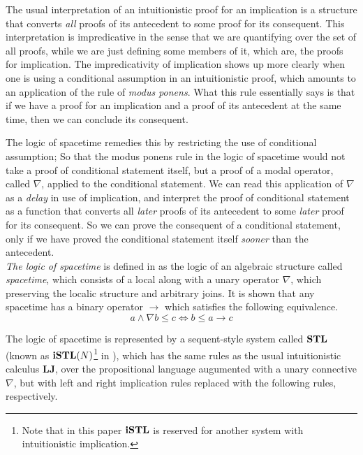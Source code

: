 The usual interpretation of an intuitionistic proof for an implication is a structure that converts \emph{all} proofs of its antecedent to some proof for its consequent. This interpretation is impredicative in the sense that we are quantifying over the set of all proofs, while we are just defining some members of it, which are, the proofs for implication. The impredicativity of implication shows up more clearly when one is using a conditional assumption in an intuitionistic proof, which amounts to an application of the rule of \emph{modus ponens}. What this rule essentially says is that if we have a proof for an implication and a proof of its antecedent at the same time, then we can conclude its consequent.

The logic of spacetime remedies this by restricting the use of conditional assumption; So that the modus ponens rule in the logic of spacetime would not take a proof of conditional statement itself, but a proof of a modal operator, called $\nabla$, applied to the conditional statement. We can read this application of $\nabla$ as a \emph{delay} in use of implication, and interpret the proof of conditional statement as a function that converts all \emph{later} proofs of its antecedent to some \emph{later} proof for its consequent. So we can prove the consequent of a conditional statement, only if we have proved the conditional statement itself \emph{sooner} than the antecedent.\\


\emph{The logic of spacetime} is defined in \cite{amir} as the logic of an algebraic structure called \emph{spacetime}, which consists of a local along with a unary operator $\nabla$, which preserving the localic structure and arbitrary joins. It is shown that any spacetime has a binary operator $\rightarrow$ which satisfies the following equivalence.
$$a \wedge \nabla b \leq c \iff b \leq a \rightarrow c$$

The logic of spacetime is represented by a sequent-style system called $\mathbf{STL}$ (known as $\mathbf{iSTL}(N)$\footnote{Note that in this paper $\mathbf{iSTL}$ is reserved for another system with intuitionistic implication.} in \cite{amir}), which has the same rules as the usual intuitionistic calculus $\mathbf{LJ}$, over the propositional language augumented with a unary connective $\nabla$, but with left and right implication rules replaced with the following rules, respectively.

